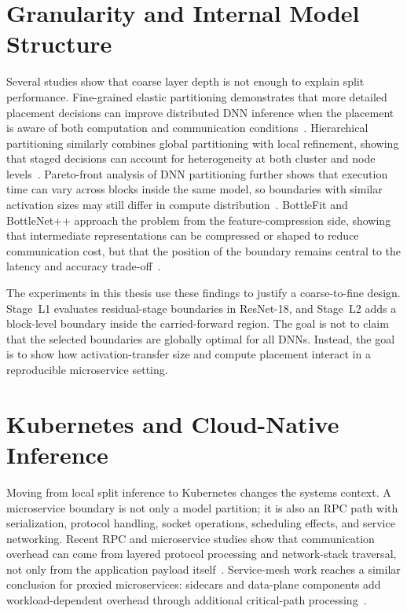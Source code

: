 \section{Granularity and Internal Model Structure}
\label{sec:rw-granularity}

Several studies show that coarse layer depth is not enough to explain split performance.
Fine-grained elastic partitioning demonstrates that more detailed placement decisions
can improve distributed DNN inference when the placement is aware of both computation
and communication conditions~\cite{fine_grained_partitioning}. Hierarchical
partitioning similarly combines global partitioning with local refinement, showing
that staged decisions can account for heterogeneity at both cluster and node
levels~\cite{hierarchical_partitioning}.
Pareto-front analysis of DNN partitioning further shows that execution time can vary
across blocks inside the same model, so boundaries with similar activation sizes may
still differ in compute distribution~\cite{pareto_split}. BottleFit and BottleNet++
approach the problem from the feature-compression side, showing that intermediate
representations can be compressed or shaped to reduce communication cost, but that the
position of the boundary remains central to the latency and accuracy
trade-off~\cite{bottlefit,bottlenet_pp}.

The experiments in this thesis use these findings to justify a coarse-to-fine design.
Stage~L1 evaluates residual-stage boundaries in ResNet-18, and Stage~L2 adds a block-level
boundary inside the carried-forward region. The goal is not to claim that the selected
boundaries are globally optimal for all DNNs. Instead, the goal is to show how
activation-transfer size and compute placement interact in a reproducible microservice
setting.

\section{Kubernetes and Cloud-Native Inference}
\label{sec:rw-cloud-native}

Moving from local split inference to Kubernetes changes the systems context. A
microservice boundary is not only a model partition; it is also an RPC path with
serialization, protocol handling, socket operations, scheduling effects, and service
networking. Recent RPC and microservice studies show that communication overhead can
come from layered protocol processing and network-stack traversal, not only from the
application payload itself~\cite{rpc_overhead_hotos25,notnets_apsys24}. Service-mesh
work reaches a similar conclusion for proxied microservices: sidecars and data-plane
components add workload-dependent overhead through additional critical-path
processing~\cite{meshinsight_socc23}.

